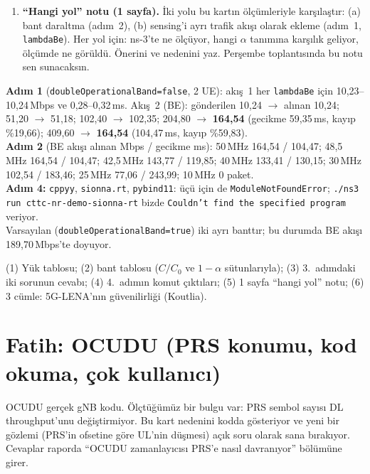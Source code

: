 \documentclass[10.5pt,a4paper]{article}
\newenvironment{komut}{\par\noindent\begin{minipage}{\textwidth}}{\end{minipage}\par}
\begin{document}
\begin{enumerate}[leftmargin=1.6em]
\begin{komut}
\begin{lstlisting}
for m in cppyy sionna.rt pybind11; do python3 -c "import $m" 2>&1 | tail -1; done
cd ~/ehb415/ns-3-dev; ./ns3 run "cttc-nr-demo-sionna-rt --PrintHelp" 2>&1 | tail -3
\end{lstlisting}
\end{komut}
Paket kurmayı \textbf{deneme} (sistem Python'una dokunma); yalnızca durumu raporla.
\item \textbf{``Hangi yol'' notu (1 sayfa).} İki yolu bu kartın ölçümleriyle karşılaştır: (a) bant daraltma (adım~2), (b) sensing'i ayrı trafik akışı olarak ekleme (adım~1, \texttt{lambdaBe}). Her yol için: ns-3'te ne ölçüyor, hangi $\alpha$ tanımına karşılık geliyor, ölçümde ne görüldü. Önerini ve nedenini yaz. Perşembe toplantısında bu notu sen sunacaksın.
\end{enumerate}

\begin{kontrol}
\textbf{Adım 1} (\texttt{doubleOperationalBand=false}, 2 UE): akış~1 her \texttt{lambdaBe} için 10,23--10,24\,Mbps ve 0,28--0,32\,ms. Akış~2 (BE): gönderilen 10,24 $\rightarrow$ alınan 10,24; 51,20 $\rightarrow$ 51,18; 102,40 $\rightarrow$ 102,35; 204,80 $\rightarrow$ \textbf{164,54} (gecikme 59,35\,ms, kayıp \%19,66); 409,60 $\rightarrow$ \textbf{164,54} (104,47\,ms, kayıp \%59,83).\\
\textbf{Adım 2} (BE akışı alınan Mbps / gecikme ms): 50\,MHz 164,54 / 104,47; 48,5\,MHz 164,54 / 104,47; 42,5\,MHz 143,77 / 119,85; 40\,MHz 133,41 / 130,15; 30\,MHz 102,54 / 183,46; 25\,MHz 77,06 / 243,99; 10\,MHz 0 paket.\\
\textbf{Adım 4:} \texttt{cppyy}, \texttt{sionna.rt}, \texttt{pybind11}: üçü için de \texttt{ModuleNotFoundError}; \texttt{./ns3 run cttc-nr-demo-sionna-rt} bizde \texttt{Couldn't find the specified program} veriyor.\\
Varsayılan (\texttt{doubleOperationalBand=true}) iki ayrı banttır; bu durumda BE akışı 189,70\,Mbps'te doyuyor.
\end{kontrol}

\begin{teslim}
(1) Yük tablosu; (2) bant tablosu ($C/C_0$ ve $1-\alpha$ sütunlarıyla); (3) 3.\ adımdaki iki sorunun cevabı; (4) 4.\ adımın komut çıktıları; (5) 1 sayfa ``hangi yol'' notu; (6) 3 cümle: 5G-LENA'nın güvenilirliği (Koutlia).
\end{teslim}

\clearpage
\section*{Fatih: OCUDU (PRS konumu, kod okuma, çok kullanıcı)}
\begin{neden}
OCUDU gerçek gNB kodu. Ölçtüğümüz bir bulgu var: PRS sembol sayısı DL throughput'unu değiştirmiyor. Bu kart nedenini kodda gösteriyor ve yeni bir gözlemi (PRS'in ofsetine göre UL'nin düşmesi) açık soru olarak sana bırakıyor. Cevaplar raporda ``OCUDU zamanlayıcısı PRS'e nasıl davranıyor'' bölümüne girer.
\end{neden}
\end{document}
